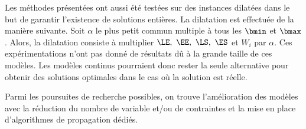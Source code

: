Les méthodes présentées ont aussi été testées sur des instances
dilatées dans le but de garantir l'existence de solutions entières.  
La dilatation est effectuée de la manière suivante. Soit $\alpha$ le
plus petit commun 
multiple à tous les $\bmin$ et $\bmax$. Alors, la dilatation
consiste à multiplier $\LE,\ \EE,\
\LS,\ \ES$ et $W_i$ par $\alpha$. Ces
expérimentations n'ont pas donné de résultats dû à la grande taille
de ces modèles. Les modèles continus pourraient donc rester  la
seule alternative pour obtenir des solutions optimales dans le cas où
la solution est réelle.

Parmi les poursuites de recherche possibles, on trouve l'amélioration
des modèles avec la réduction du nombre de variable et/ou de contraintes et la
mise en place d'algorithmes de propagation dédiés.
\newpage
\begin{bibunit}[alpha]
\nocite{JFPC}
\nocite*
\putbib[JFPC]
\end{bibunit}







